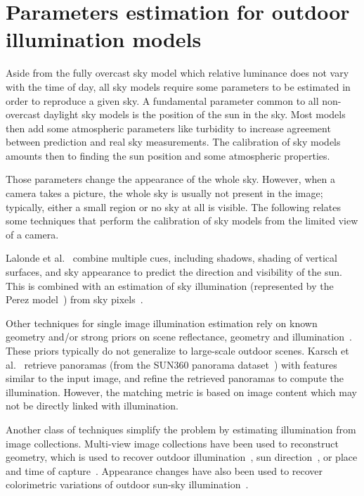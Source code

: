 \section{Parameters estimation for outdoor illumination models}


Aside from the fully overcast sky model which relative luminance does not vary with the time of day, all sky models require some parameters to be estimated in order to reproduce a given sky. A fundamental parameter common to all non-overcast daylight sky models is the position of the sun in the sky. Most models then add some atmospheric parameters like turbidity to increase agreement between prediction and real sky measurements. The calibration of sky models amounts then to finding the sun position and some atmospheric properties. 

Those parameters change the appearance of the whole sky. However, when a camera takes a picture, the whole sky is usually not present in the image; typically, either a small region or no sky at all is visible. The following relates some techniques that perform the calibration of sky models from the limited view of a camera. 

Lalonde et al.~\cite{lalonde-ijcv-12} combine multiple cues, including shadows, shading of vertical surfaces, and sky appearance to predict the direction and visibility of the sun. This is combined with an estimation of sky illumination (represented by the Perez model~\cite{perez1993allweather}) from sky pixels~\cite{lalonde-ijcv-10}. 

Other techniques for single image illumination estimation rely on known geometry and/or strong priors on scene reflectance, geometry and illumination~\cite{barron-pami-15,barron2013rgbd,lombardi2016reflectance}. These priors typically do not generalize to large-scale outdoor scenes. Karsch et al.~\cite{karsch2014automatic} retrieve panoramas (from the SUN360 panorama dataset~\cite{xiao-cvpr-12}) with features similar to the input image, and refine the retrieved panoramas to compute the illumination. However, the matching metric is based on image content which may not be directly linked with illumination. 

Another class of techniques simplify the problem by estimating illumination from image collections. Multi-view image collections have been used to reconstruct geometry, which is used to recover outdoor illumination~\cite{haber2009relighting,lalonde-3dv-14,shan2015visual,duchene2015multiview}, sun direction~\cite{wehrwein2015shadows}, or place and time of capture~\cite{hauagge2014outdoor}. Appearance changes have also been used to recover colorimetric variations of outdoor sun-sky illumination~\cite{sunkavalli2008color}. 

